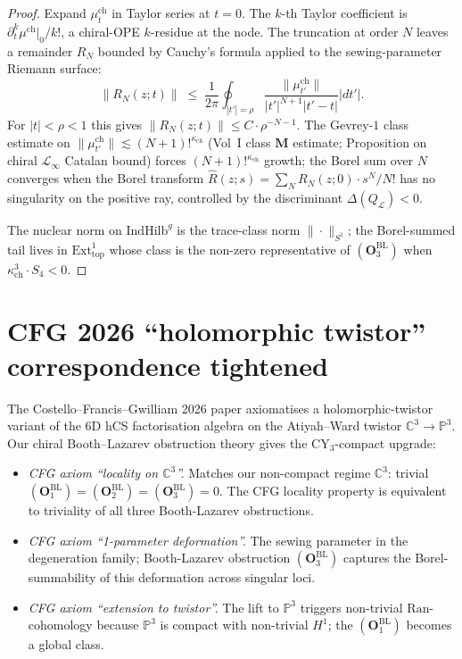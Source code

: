 \documentclass[11pt]{amsart}
\newcommand{\kch}{\kappa_{\mathrm{ch}}}
\newcommand{\cL}{\mathcal{L}}
\newcommand{\Ran}{\mathrm{Ran}}
\newcommand{\IndHilb}{\mathrm{IndHilb}}
\newcommand{\bC}{\mathbb{C}}
\begin{document}
\begin{proof}
Expand $\mu^{\mathrm{ch}}_t$ in Taylor series at $t = 0$. The
$k$-th Taylor coefficient is $\partial_t^k \mu^{\mathrm{ch}}|_0 /
k!$, a chiral-OPE $k$-residue at the node. The truncation at order
$N$ leaves a remainder $R_N$ bounded by Cauchy's formula applied
to the sewing-parameter Riemann surface:
\[
\|R_N(z; t)\| \;\leq\; \frac{1}{2\pi} \oint_{|t'| = \rho}
\frac{\|\mu^{\mathrm{ch}}_{t'}\|}{|t'|^{N+1} |t' - t|} |dt'|.
\]
For $|t| < \rho < 1$ this gives
$\|R_N(z; t)\| \leq C \cdot \rho^{-N-1}$. The
Gevrey-$1$ class estimate on $\|\mu^{\mathrm{ch}}_{t'}\|
\lesssim (N+1)!^{\kch}$ (Vol~I class $\mathbf{M}$ estimate;
Proposition on chiral $\cL_\infty$ Catalan bound) forces
$(N+1)!^{\kch}$ growth; the Borel sum over $N$ converges when the
Borel transform $\hat R(z; s) = \sum_N R_N(z; 0) \cdot s^N / N!$
has no singularity on the positive ray, controlled by the
discriminant $\Delta(Q_\cL) < 0$.

The nuclear norm on $\IndHilb^g$ is the trace-class norm
$\|\cdot\|_{S^1}$; the Borel-summed tail lives in
$\mathrm{Ext}^1_{\mathrm{top}}$ whose class is the non-zero
representative of $(\mathbf{O}_3^{\mathrm{BL}})$ when
$\kch^3 \cdot S_4 < 0$.
\end{proof}

\section{CFG 2026 ``holomorphic twistor'' correspondence tightened}
\label{sec:cfg-tightened}

The Costello--Francis--Gwilliam 2026 paper axiomatises a
holomorphic-twistor variant of the 6D hCS factorisation algebra on
the Atiyah--Ward twistor $\bC^3 \to \mathbb{P}^3$. Our chiral
Booth--Lazarev obstruction theory gives the CY$_3$-compact
upgrade:

\begin{itemize}[leftmargin=2em]
\item \emph{CFG axiom ``locality on $\bC^3$''.} Matches our
non-compact regime $\bC^3$: trivial
$(\mathbf{O}_1^{\mathrm{BL}}) = (\mathbf{O}_2^{\mathrm{BL}}) =
(\mathbf{O}_3^{\mathrm{BL}}) = 0$. The CFG locality property is
equivalent to triviality of all three Booth-Lazarev obstructions.
\item \emph{CFG axiom ``1-parameter deformation''.} The sewing
parameter in the degeneration family; Booth-Lazarev obstruction
$(\mathbf{O}_3^{\mathrm{BL}})$ captures the Borel-summability of
this deformation across singular loci.
\item \emph{CFG axiom ``extension to twistor''.} The lift to
$\mathbb{P}^3$ triggers non-trivial $\Ran$-cohomology because
$\mathbb{P}^3$ is compact with non-trivial $H^1$; the
$(\mathbf{O}_1^{\mathrm{BL}})$ becomes a global class.
\end{itemize}
\end{document}
